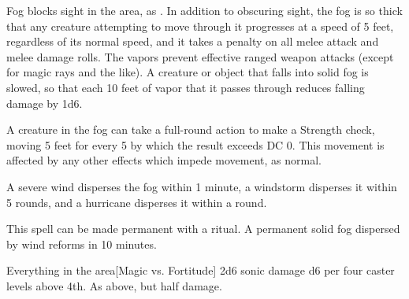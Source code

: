 \begin{spellheader}
    \spelldur{\durshort}
\end{spellheader}
\begin{spelleffects}
    \spelleffect Fog blocks sight in the area, as . In addition to obscuring sight, the fog is so thick that any creature attempting to move through it progresses at a speed of 5 feet, regardless of its normal speed, and it takes a  penalty on all melee attack and melee damage rolls. The vapors prevent effective ranged weapon attacks (except for magic rays and the like). A creature or object that falls into solid fog is slowed, so that each 10 feet of vapor that it passes through reduces falling damage by 1d6.
    \par A creature in the fog can take a full-round action to make a Strength check, moving 5 feet for every 5 by which the result exceeds DC 0. This movement is affected by any other effects which impede movement, as normal.
\end{spelleffects}
\begin{spellfooter}
    \spellnotes \fogspellnotes A severe wind disperses the fog within 1 minute, a windstorm disperses it within 5 rounds, and a hurricane disperses it within a round.

    This spell can be made permanent with a  ritual. A permanent solid fog dispersed by wind reforms in 10 minutes.
\end{spellfooter}

\begin{spellheader}
\end{spellheader}
\begin{spelleffects}
    \begin{spelltarget}{Everything in the area}[Magic vs. Fortitude]
        \spellsuccess 2d6 sonic damage \add d6 per four caster levels above 4th.
        \spellfailure As above, but half damage.
    \end{spelltarget}
\end{spelleffects}
\begin{spellfooter}
    
\end{spellfooter}

